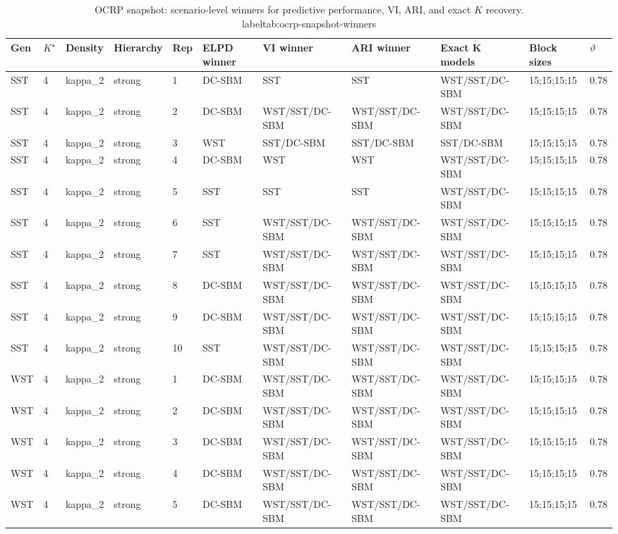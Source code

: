 \begin{table}[!h]
\centering
\caption{OCRP snapshot: scenario-level winners for predictive performance, VI, ARI, and exact $K$ recovery.\\label{tab:ocrp-snapshot-winners}}
\centering
\begin{tabular}[t]{lllllllllll}
\toprule
Gen & $K^\star$ & Density & Hierarchy & Rep & ELPD winner & VI winner & ARI winner & Exact K models & Block sizes & $\vartheta$\\
\midrule
SST & 4 & kappa_2 & strong & 1 & DC-SBM & SST & SST & WST/SST/DC-SBM & 15;15;15;15 & 0.78\\
SST & 4 & kappa_2 & strong & 2 & DC-SBM & WST/SST/DC-SBM & WST/SST/DC-SBM & WST/SST/DC-SBM & 15;15;15;15 & 0.78\\
SST & 4 & kappa_2 & strong & 3 & WST & SST/DC-SBM & SST/DC-SBM & SST/DC-SBM & 15;15;15;15 & 0.78\\
SST & 4 & kappa_2 & strong & 4 & DC-SBM & WST & WST & WST/SST/DC-SBM & 15;15;15;15 & 0.78\\
SST & 4 & kappa_2 & strong & 5 & SST & SST & SST & WST/SST/DC-SBM & 15;15;15;15 & 0.78\\
SST & 4 & kappa_2 & strong & 6 & SST & WST/SST/DC-SBM & WST/SST/DC-SBM & WST/SST/DC-SBM & 15;15;15;15 & 0.78\\
SST & 4 & kappa_2 & strong & 7 & SST & WST/SST/DC-SBM & WST/SST/DC-SBM & WST/SST/DC-SBM & 15;15;15;15 & 0.78\\
SST & 4 & kappa_2 & strong & 8 & DC-SBM & WST/SST/DC-SBM & WST/SST/DC-SBM & WST/SST/DC-SBM & 15;15;15;15 & 0.78\\
SST & 4 & kappa_2 & strong & 9 & DC-SBM & WST/SST/DC-SBM & WST/SST/DC-SBM & WST/SST/DC-SBM & 15;15;15;15 & 0.78\\
SST & 4 & kappa_2 & strong & 10 & SST & WST/SST/DC-SBM & WST/SST/DC-SBM & WST/SST/DC-SBM & 15;15;15;15 & 0.78\\
WST & 4 & kappa_2 & strong & 1 & DC-SBM & WST/SST/DC-SBM & WST/SST/DC-SBM & WST/SST/DC-SBM & 15;15;15;15 & 0.78\\
WST & 4 & kappa_2 & strong & 2 & DC-SBM & WST/SST/DC-SBM & WST/SST/DC-SBM & WST/SST/DC-SBM & 15;15;15;15 & 0.78\\
WST & 4 & kappa_2 & strong & 3 & DC-SBM & WST/SST/DC-SBM & WST/SST/DC-SBM & WST/SST/DC-SBM & 15;15;15;15 & 0.78\\
WST & 4 & kappa_2 & strong & 4 & DC-SBM & WST/SST/DC-SBM & WST/SST/DC-SBM & WST/SST/DC-SBM & 15;15;15;15 & 0.78\\
WST & 4 & kappa_2 & strong & 5 & DC-SBM & WST/SST/DC-SBM & WST/SST/DC-SBM & WST/SST/DC-SBM & 15;15;15;15 & 0.78\\

\end{tabular}
\end{table}
